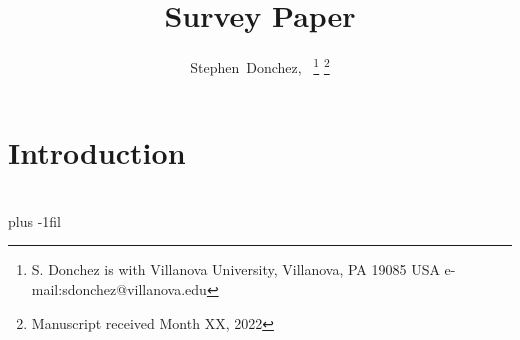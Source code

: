 \documentclass[journal]{LaTeX_Assets/IEEETransactions_LaTeX/IEEEtran/IEEEtran}
\begin{document}
    \title{Survey Paper}
    \author{Stephen~Donchez,~%
    \thanks{S. Donchez is with Villanova University, Villanova, PA 19085 USA 
    \mbox{e-mail:sdonchez@villanova.edu}}%
    \thanks{Manuscript received Month XX, 2022}}%

    \maketitle


    \section{Introduction}
    \section{}


    
    

    \vskip 0pt plus -1fil

    
\end{document}
